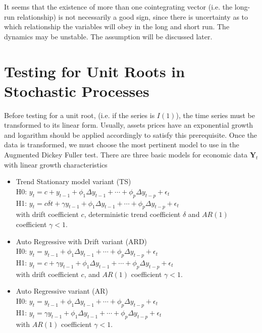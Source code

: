 \documentclass[11pt,a4,twosided,singlespacing,titlepagenumber=on]{scrreprt}
\numberwithin{equation}{chapter} %
\theoremstyle{remark}
\newcommand{\matr}[1]{\mathbf{#1}}
\begin{document}
It seems that the existence of more than one cointegrating vector (i.e. the long-run relationship) is not necessarily a good sign, since there is uncertainty as to which relationship the variables will obey in the long and short run. The dynamics may be unstable. The assumption will be discussed later.

\section{Testing for Unit Roots in Stochastic Processes}
\label{sec:unit_root_testing}
Before testing for a unit root, (i.e. if the series is $I(1)$), the time series must be transformed to its linear form. Usually, assets prices have an exponential growth and logarithm should be applied accordingly to satisfy this prerequisite. Once the data is transformed, we must choose the most pertinent model to use in the Augmented Dickey Fuller test. There are three basic models for economic data $\matr{Y}_t$ with linear growth characteristics
\begin{itemize}
\item Trend Stationary model variant (TS) \\
H0: $y_t = c + y_{t-1} + \phi_1 \Delta y_{t-1} + \cdots + \phi_p \Delta y_{t-p} + \epsilon_t $ \\
H1: $y_t = c \delta t + \gamma y_{t-1} + \phi_1 \Delta y_{t-1} + \cdots + \phi_p \Delta y_{t-p} + \epsilon_t $ \\
with drift coefficient $c$, deterministic trend coefficient $\delta$ and $AR(1)$ coefficient $\gamma <1$.
\item Auto Regressive with Drift variant (ARD) \\
H0: $y_t = y_{t-1} + \phi_1 \Delta y_{t-1} + \cdots + \phi_p \Delta y_{t-p} + \epsilon_t $ \\
H1: $y_t = c + \gamma y_{t-1} + \phi_1 \Delta y_{t-1} + \cdots + \phi_p \Delta y_{t-p} + \epsilon_t $ \\
with drift coefficient $c$, and $AR(1)$ coefficient $\gamma <1$.
\item Auto Regressive variant (AR) \\
H0: $y_t = y_{t-1} + \phi_1 \Delta y_{t-1} + \cdots + \phi_p \Delta y_{t-p} + \epsilon_t $ \\
H1: $y_t = \gamma y_{t-1} + \phi_1 \Delta y_{t-1} + \cdots + \phi_p \Delta y_{t-p} + \epsilon_t $ \\
with $AR(1)$ coefficient $\gamma <1$.
\end{itemize}
\end{document}
